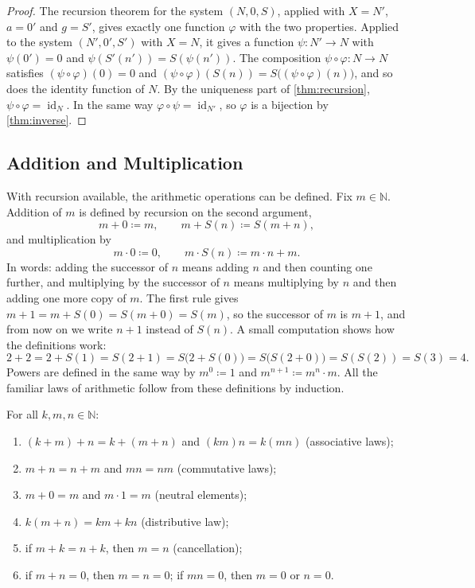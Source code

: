 \begin{proof}
The recursion theorem for the system $(N,0,S)$, applied with $X=N'$, $a=0'$ and $g=S'$, gives exactly one function $\varphi$ with the two properties. Applied to the system $(N',0',S')$ with $X=N$, it gives a function $\psi\colon N'\to N$ with $\psi(0')=0$ and $\psi(S'(n'))=S(\psi(n'))$. The composition $\psi\circ\varphi\colon N\to N$ satisfies $(\psi\circ\varphi)(0)=0$ and $(\psi\circ\varphi)(S(n))=S\bigl((\psi\circ\varphi)(n)\bigr)$, and so does the identity function of $N$. By the uniqueness part of \cref{thm:recursion}, $\psi\circ\varphi=\operatorname{id}_N$. In the same way $\varphi\circ\psi=\operatorname{id}_{N'}$, so $\varphi$ is a bijection by \cref{thm:inverse}.
\end{proof}

\subsection{Addition and Multiplication}

With recursion available, the arithmetic operations can be defined. Fix $m\in\mathbb N$. Addition of $m$ is defined by recursion on the second argument,
\begin{equation}
m+0\coloneqq m,\qquad m+S(n)\coloneqq S(m+n),
\label{eq:peano-add}
\end{equation}
and multiplication by
\begin{equation}
m\cdot0\coloneqq0,\qquad m\cdot S(n)\coloneqq m\cdot n+m .
\label{eq:peano-mul}
\end{equation}
In words: adding the successor of $n$ means adding $n$ and then counting one further, and multiplying by the successor of $n$ means multiplying by $n$ and then adding one more copy of $m$. The first rule gives $m+1=m+S(0)=S(m+0)=S(m)$, so the successor of $m$ is $m+1$, and from now on we write $n+1$ instead of $S(n)$. A small computation shows how the definitions work:
\[
2+2=2+S(1)=S(2+1)=S\bigl(2+S(0)\bigr)=S\bigl(S(2+0)\bigr)=S(S(2))=S(3)=4 .
\]
Powers are defined in the same way by $m^0\coloneqq1$ and $m^{n+1}\coloneqq m^n\cdot m$. All the familiar laws of arithmetic follow from these definitions by induction.

\begin{theorem}
\label{thm:n-arith}
For all $k,m,n\in\mathbb N$:
\begin{enumerate}
\item $(k+m)+n=k+(m+n)$ and $(km)n=k(mn)$ (associative laws);
\item $m+n=n+m$ and $mn=nm$ (commutative laws);
\item $m+0=m$ and $m\cdot1=m$ (neutral elements);
\item $k(m+n)=km+kn$ (distributive law);
\item if $m+k=n+k$, then $m=n$ (cancellation);
\item if $m+n=0$, then $m=n=0$; if $mn=0$, then $m=0$ or $n=0$.
\end{enumerate}
\end{theorem}

